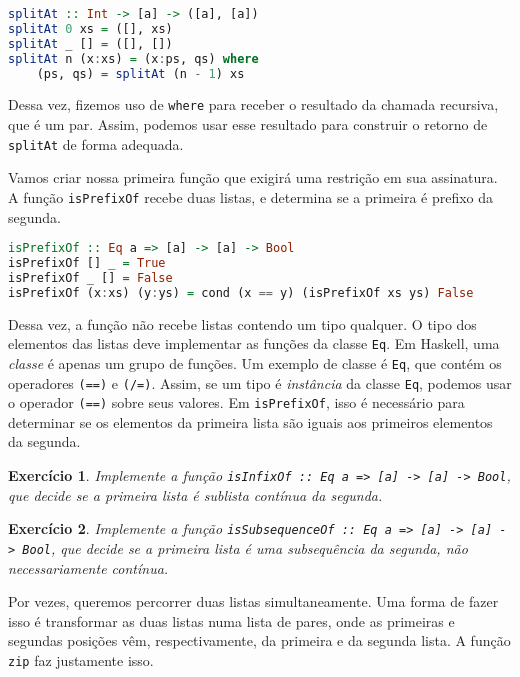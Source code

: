 \documentclass[a4paper]{article}
\newtheorem{exercicio}{Exercício}
\begin{document}
\begin{lstlisting}[language=haskell, frame=single]
splitAt :: Int -> [a] -> ([a], [a])
splitAt 0 xs = ([], xs)
splitAt _ [] = ([], [])
splitAt n (x:xs) = (x:ps, qs) where
	(ps, qs) = splitAt (n - 1) xs
\end{lstlisting}

Dessa vez, fizemos uso de \texttt{where} para receber o resultado da chamada recursiva, que é um par.
Assim, podemos usar esse resultado para construir o retorno de \texttt{splitAt} de forma adequada.

Vamos criar nossa primeira função que exigirá uma restrição em sua assinatura.
A função \texttt{isPrefixOf} recebe duas listas, e determina se a primeira é prefixo da segunda.

\begin{lstlisting}[language=haskell, frame=single]
isPrefixOf :: Eq a => [a] -> [a] -> Bool
isPrefixOf [] _ = True
isPrefixOf _ [] = False
isPrefixOf (x:xs) (y:ys) = cond (x == y) (isPrefixOf xs ys) False
\end{lstlisting}

Dessa vez, a função não recebe listas contendo um tipo qualquer.
O tipo dos elementos das listas deve implementar as funções da classe \texttt{Eq}.
Em Haskell, uma \emph{classe} é apenas um grupo de funções.
Um exemplo de classe é \texttt{Eq}, que contém os operadores \texttt{(==)} e \texttt{(/=)}.
Assim, se um tipo é \emph{instância} da classe \texttt{Eq}, podemos usar o operador \texttt{(==)} sobre seus valores.
Em \texttt{isPrefixOf}, isso é necessário para determinar se os elementos da primeira lista são iguais aos primeiros elementos da segunda.

\begin{exercicio}	\label{exercicioIsInfixOf}
	Implemente a função \emph{\texttt{isInfixOf :: Eq a => [a] -> [a] -> Bool}}, que decide se a primeira lista é sublista contínua da segunda.
\end{exercicio}

\begin{exercicio}
	Implemente a função \emph{\texttt{isSubsequenceOf :: Eq a => [a] -> [a] -> Bool}}, que decide se a primeira lista é uma subsequência da segunda, não necessariamente contínua.
\end{exercicio}

Por vezes, queremos percorrer duas listas simultaneamente.
Uma forma de fazer isso é transformar as duas listas numa lista de pares, onde as primeiras e segundas posições vêm, respectivamente, da primeira e da segunda lista.
A função \texttt{zip} faz justamente isso.
\end{document}
